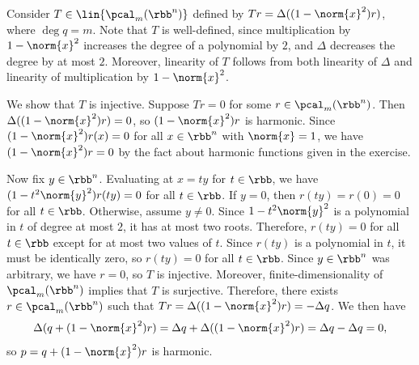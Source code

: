 \begin{sol}
    Consider $T \in \lin{\pcal_m(\rbb^n)}$ defined by $Tr = \Delta((1 - \norm{x}^2)r)$, where $\deg q = m$.
    Note that $T$ is well-defined, since multiplication by $1 - \norm{x}^2$ increases the degree of a polynomial by $2$, and $\Delta$ decreases the degree by at most $2$.
    Moreover, linearity of $T$ follows from both linearity of $\Delta$ and linearity of multiplication by $1 - \norm{x}^2$.

    We show that $T$ is injective.
    Suppose $Tr = 0$ for some $r \in \pcal_m(\rbb^n)$.
    Then $\Delta((1 - \norm{x}^2)r) = 0$, so $(1 - \norm{x}^2)r$ is harmonic.
    Since $(1 - \norm{x}^2)r(x) = 0$ for all $x \in \rbb^n$ with $\norm{x} = 1$, we have $(1 - \norm{x}^2)r = 0$ by the fact about harmonic functions given in the exercise.
    
    Now fix $y \in \rbb^n$.
    Evaluating at $x = ty$ for $t \in \rbb$, we have $(1 - t^2\norm{y}^2)r(ty) = 0$ for all $t \in \rbb$.
    If $y = 0$, then $r(ty) = r(0) = 0$ for all $t \in \rbb$.
    Otherwise, assume $y \neq 0$.
    Since $1 - t^2\norm{y}^2$ is a polynomial in $t$ of degree at most $2$, it has at most two roots.
    Therefore, $r(ty) = 0$ for all $t \in \rbb$ except for at most two values of $t$.
    Since $r(ty)$ is a polynomial in $t$, it must be identically zero, so $r(ty) = 0$ for all $t \in \rbb$.
    Since $y \in \rbb^n$ was arbitrary, we have $r = 0$, so $T$ is injective.
    Moreover, finite-dimensionality of $\pcal_m(\rbb^n)$ implies that $T$ is surjective.
    Therefore, there exists $r \in \pcal_m(\rbb^n)$ such that $Tr = \Delta((1 - \norm{x}^2)r) = -\Delta q$.
    We then have
    \[
        \Delta(q + (1 - \norm{x}^2)r) = \Delta q + \Delta((1 - \norm{x}^2)r) = \Delta q - \Delta q = 0,
    \]
    so $p = q + (1 - \norm{x}^2)r$ is harmonic.
\end{sol}